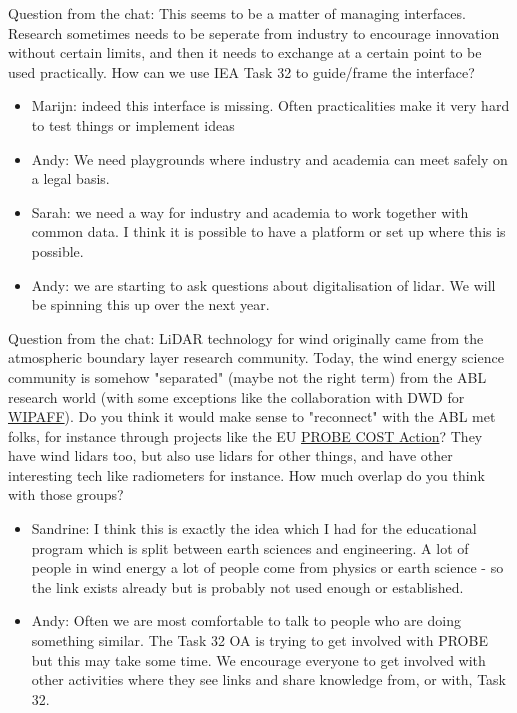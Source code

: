 Question from the chat: This seems to be a matter of managing
interfaces. Research sometimes needs to be seperate from industry to
encourage innovation without certain limits, and then it needs to
exchange at a certain point to be used practically. How can we use IEA
Task 32 to guide/frame the interface?

\begin{itemize}
	\item Marijn: indeed this interface is missing. Often practicalities make it very hard to test things or implement ideas
	\item Andy: We need playgrounds where industry and academia can meet safely on a legal basis.
	\item Sarah: we need a way for industry and academia to work together with common data. I think it is possible to have a platform or set up where this is possible.
	\item Andy: we are starting to ask questions about digitalisation of lidar. We will be spinning this up over the next year.
\end{itemize}

Question from the chat: LiDAR technology for wind originally came from the atmospheric boundary layer research community. Today, the wind energy science community is somehow "separated" (maybe not the right term) from the ABL research world (with some exceptions like the collaboration with DWD for \href{https://www.windfors.de/en/projects/wipaff/}{WIPAFF}). Do you think it would make sense to "reconnect" with the ABL met folks, for instance through projects like the EU \href{https://www.cost.eu/actions/CA18235/\#tabs\%7CName:overview}{PROBE COST Action}? They have wind lidars too, but also use lidars for other things, and have other interesting tech like radiometers for instance. How much overlap do you think with those groups?

\begin{itemize}
	\item Sandrine: I think this is exactly the idea which I had for the educational program which is split between earth sciences and engineering. A lot of people in wind energy a lot of people come from physics or earth science - so the link exists already but is probably not used enough or established.
	\item Andy: Often we are most comfortable to talk to people who are doing something similar. The Task 32 OA is trying to get involved with PROBE but this may take some time. We encourage everyone to get involved with other activities where they see links and share knowledge from, or with, Task 32.
\end{itemize}

